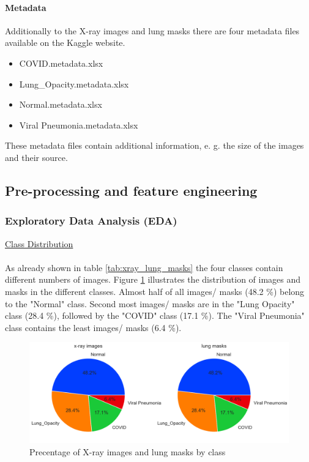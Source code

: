 \documentclass{article}
\begin{document}
\paragraph{Metadata}
Additionally to the X-ray images and lung masks there are four metadata files available on the Kaggle website.

\begin{itemize}
    \item COVID.metadata.xlsx
    \item Lung\_Opacity.metadata.xlsx
    \item Normal.metadata.xlsx
    \item Viral Pneumonia.metadata.xlsx
    \end{itemize}

These metadata files contain additional information, e. g. the size of the images and their source. 

\subsection{Pre-processing and feature engineering}

\vspace{0.5cm}

\subsubsection{Exploratory Data Analysis (EDA)} \label{sec:EDA}
\vspace{0.5cm}

\underline{Class Distribution}\\
\\
As already shown in table \ref{tab:xray_lung_masks} the four classes contain different numbers of images. Figure \ref{fig:class-dist} illustrates the distribution of images and masks in the different classes. Almost half of all images/ masks (48.2 \%) belong to the "Normal" class. Second most images/ masks are in the "Lung Opacity" class (28.4 \%), followed by the "COVID" class (17.1 \%). The "Viral Pneumonia" class contains the least images/ masks (6.4 \%).

\vspace{0.3cm}

\begin{figure}[h!] %
    \centering
    \includegraphics[width=1.0\linewidth]{classes.png}
    \caption{Precentage of X-ray images and lung masks by class}
    \label{fig:class-dist}
\end{figure}
\end{document}

